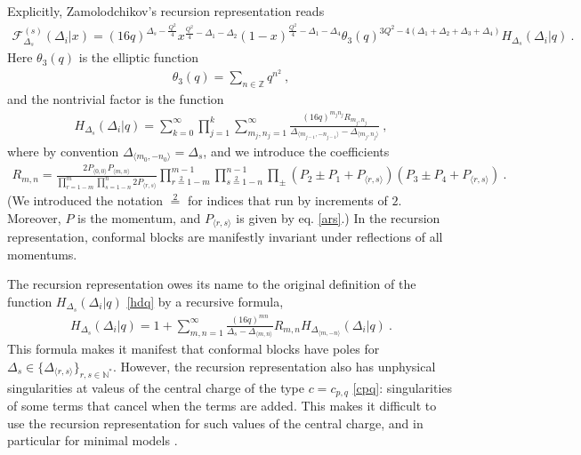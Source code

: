 \documentclass[12pt, a4paper, notitlepage, twoside]{report}
\numberwithin{equation}{section}
\theoremstyle{break}
\begin{document}
Explicitly, Zamolodchikov's recursion representation reads 
\begin{align}
 \mathcal{F}^{(s)}_{\Delta_s}(\Delta_i|x) 
=  (16q)^{\Delta_s -\frac{Q^2}{4}} x^{\frac{Q^2}{4}-\Delta_1-\Delta_2} (1-x)^{\frac{Q^2}{4}-\Delta_1-\Delta_4} \theta_3(q)^{3Q^2-4(\Delta_1+\Delta_2+\Delta_3+\Delta_4)} H_{\Delta_s}(\Delta_i|q)\ .
\end{align}
Here $\theta_3(q)$ is the elliptic function
\begin{align}
 \theta_3(q) = \sum_{n\in{\mathbb{Z}}} q^{n^2}\ ,
\end{align}
 and the nontrivial factor is the function
\begin{align}
 H_{\Delta_s}(\Delta_i|q) = \sum_{k=0}^\infty \prod_{j=1}^k \sum_{m_j,n_j=1}^\infty \frac{(16q)^{m_jn_j}R_{m_j,n_j}}{\Delta_{\langle m_{j-1},-n_{j-1} \rangle}-\Delta_{\langle m_j,n_j\rangle}}\ ,
\label{hdq}
\end{align}
where by convention $\Delta_{\langle m_0,-n_0\rangle} = \Delta_s$, and we introduce the coefficients
\begin{align}
 R_{m,n} = \frac{2P_{\langle 0,0\rangle} P_{\langle m,n\rangle}}{\prod_{r=1-m}^m \prod_{s=1-n}^n 2P_{\langle r,s\rangle}}
\prod_{r\overset{2}{=}1-m}^{m-1} \prod_{s\overset{2}{=}1-n}^{n-1} \prod_\pm (P_2\pm P_1 + P_{\langle r,s\rangle}) (P_3\pm P_4 +P_{\langle r,s\rangle})\ .
\end{align}
(We introduced the notation $\overset{2}{=}$ for indices that run by increments of $2$.
Moreover, $P$ is the momentum, and $P_{\langle r,s \rangle}$ is given by eq. \eqref{ars}.) In the recursion representation, conformal blocks are manifestly invariant under reflections of all momentums.

The recursion representation owes its name to the original definition of the function $H_{\Delta_s}(\Delta_i|q)$ \eqref{hdq} by a recursive formula,
\begin{align}
 H_{\Delta_s}(\Delta_i|q) = 1 + \sum_{m,n=1}^\infty \frac{(16q)^{mn}}{\Delta_s-\Delta_{\langle m,n\rangle}} R_{m,n} H_{\Delta_{\langle m,-n\rangle}}(\Delta_i|q)\ .
 \label{hrec}
\end{align}
This formula makes it manifest that conformal blocks have poles for $\Delta_s \in \{\Delta_{\langle r,s\rangle}\}_{r,s\in {\mathbb{N}}^*}$. However, the recursion representation also has unphysical singularities at 
valeus of the central charge of the type $c= c_{p, q}$ \eqref{cpq}: singularities of some terms that cancel when the terms are added. This makes it difficult to use the recursion representation for such values of the central charge, and in particular for minimal models \cite{rib18}.
\end{document}
